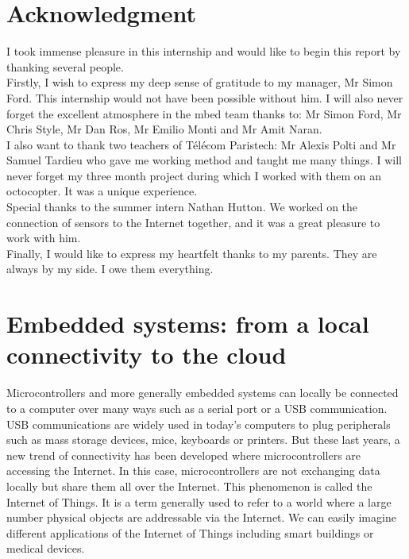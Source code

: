 \documentclass[pdftex,10pt,a4paper]{report}
\begin{document}



\chapter*{Acknowledgment}
I took immense pleasure in this internship and would like to begin this report by thanking several people. \\

Firstly, I wish to express my deep sense of gratitude to my manager, Mr Simon Ford. This internship would not have been possible without him. I will also never forget the excellent atmosphere in the mbed team thanks to: Mr Simon Ford, Mr Chris Style, Mr Dan Ros, Mr Emilio Monti and Mr Amit Naran. \\

I also want to thank two teachers of T\'{e}l\'{e}com Paristech: Mr Alexis Polti and Mr Samuel Tardieu who gave me working method and taught me many things. I will never forget my three month project during which I worked with them on an octocopter. It was a unique experience. \\

Special thanks to the summer intern Nathan Hutton. We worked on the connection of sensors to the Internet together, and it was a great pleasure to work with him. \\

Finally, I would like to express my heartfelt thanks to my parents. They are always by my side. I owe them everything.

\chapter*{Embedded systems: from a local connectivity to the cloud}
Microcontrollers and more generally embedded systems can locally be connected to a computer over many ways such as a serial port or a USB communication. USB communications are widely used in today's computers to plug peripherals such as mass storage devices, mice, keyboards or printers. But these last years, a new trend of connectivity has been developed where microcontrollers are accessing the Internet. In this case, microcontrollers are not exchanging data locally but share them all over the Internet. This phenomenon is called the Internet of Things. It is a term generally used to refer to a world where a large number physical objects are addressable via the Internet. We can easily imagine different applications of the Internet of Things including smart buildings or medical devices.\\
\end{document}
